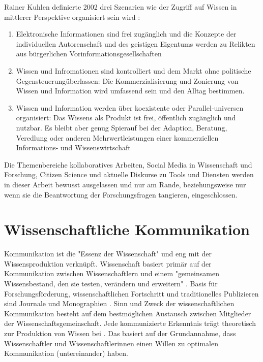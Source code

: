 Rainer Kuhlen definierte 2002 drei Szenarien wie der Zugriff auf Wissen in mittlerer Perspektive organisiert sein wird \cite{Kuhlen_2002_universalaccess}:
\begin{enumerate}
\item Elektronische Informationen sind frei zugänglich und die Konzepte der individuellen Autorenschaft und des geistigen Eigentums werden zu Relikten aus bürgerlichen Vorinformationsgesellschaften
\item Wissen und Infromationen sind kontrolliert und dem Markt ohne politische Gegensteuerungüberlassen: Die Kommerzialisierung und Zonierung von Wissen und Information wird umfassend sein und den Alltag bestimmen.
\item Wissen und Information werden über koexistente oder Parallel-universen organisiert: Das Wissens als Produkt ist frei, öffentlich zugänglich und nutzbar. Es bleibt aber genug Spierauf bei der Adaption, Beratung, Veredlung oder anderen Mehrwertleistungen einer kommerziellen Informations- und Wissenswirtschaft
\end{enumerate}

Die Themenbereiche kollaboratives Arbeiten, Social Media in Wissenschaft und Forschung, Citizen Science und aktuelle Diskurse zu Tools und Diensten werden in dieser Arbeit bewusst ausgelassen und nur am Rande, beziehungsweise nur wenn sie die Beantwortung der Forschungsfragen tangieren, eingeschlossen.

\section{Wissenschaftliche Kommunikation}

Kommunikation ist die "Essenz der Wissenschaft" \cite{garvey_2014_communication} und eng mit der Wissensproduktion verknüpft. Wissenschaft basiert primär auf der Kommunikation zwischen Wissenschaftlern und einem "gemeinsamen Wissensbestand, den sie testen, verändern und erweitern" \cite{Gl_ser_2007}. Basis für Forschungsförderung, wissenschaftlichen Fortschritt und traditionelles Publizieren sind Journale und Monographien \cite{cope2014future}. Sinn und Zweck der wissenschaftlichen Kommunikation besteht auf dem bestmöglichen Austausch zwischen Mitglieder der Wissenschaftsgemeinschaft. Jede kommunizierte Erkenntnis trägt theoretisch zur Produktion von Wissen bei \cite{kaden_2009_library}. Das basiert auf der Grundannahme, dass Wissenschaftler und Wissenschaftlerinnen einen Willen zu optimalen Kommunikation (untereinander) haben.

